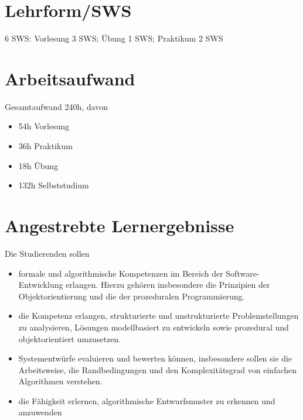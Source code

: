\hypertarget{lehrformswspathlabelmi-2017modulbeschreibungen-bachelorba_algorithmenundprogrammierung1}{%
\section*{Lehrform/SWS\label{/mi-2017/modulbeschreibungen-bachelor/BA_AlgorithmenundProgrammierung1}}\label{lehrformswspathlabelmi-2017modulbeschreibungen-bachelorba_algorithmenundprogrammierung1}}

6 SWS: Vorlesung 3 SWS; Übung 1 SWS; Praktikum 2 SWS

\hypertarget{arbeitsaufwandpathlabelmi-2017modulbeschreibungen-bachelorba_algorithmenundprogrammierung1}{%
\section*{Arbeitsaufwand\label{/mi-2017/modulbeschreibungen-bachelor/BA_AlgorithmenundProgrammierung1}}\label{arbeitsaufwandpathlabelmi-2017modulbeschreibungen-bachelorba_algorithmenundprogrammierung1}}

Gesamtaufwand 240h, davon

\begin{itemize}
\tightlist
\item
  54h Vorlesung
\item
  36h Praktikum
\item
  18h Übung
\item
  132h Selbststudium
\end{itemize}

\hypertarget{angestrebte-lernergebnissepathlabelmi-2017modulbeschreibungen-bachelorba_algorithmenundprogrammierung1}{%
\section*{Angestrebte
Lernergebnisse\label{/mi-2017/modulbeschreibungen-bachelor/BA_AlgorithmenundProgrammierung1}}\label{angestrebte-lernergebnissepathlabelmi-2017modulbeschreibungen-bachelorba_algorithmenundprogrammierung1}}

Die Studierenden sollen

\begin{itemize}
\tightlist
\item
  formale und algorithmische Kompetenzen im Bereich der
  Software-Entwicklung erlangen. Hierzu gehören insbesondere die
  Prinzipien der Objektorientierung und die der prozeduralen
  Programmierung.
\item
  die Kompetenz erlangen, strukturierte und unstrukturierte
  Problemstellungen zu analysieren, Lösungen modellbasiert zu entwickeln
  sowie prozedural und objektorientiert umzusetzen.
\item
  Systementwürfe evaluieren und bewerten können, insbesondere sollen sie
  die Arbeitsweise, die Randbedingungen und den Komplexitätsgrad von
  einfachen Algorithmen verstehen.
\item
  die Fähigkeit erlernen, algorithmische Entwurfsmuster zu erkennen und
  anzuwenden
\end{itemize}


